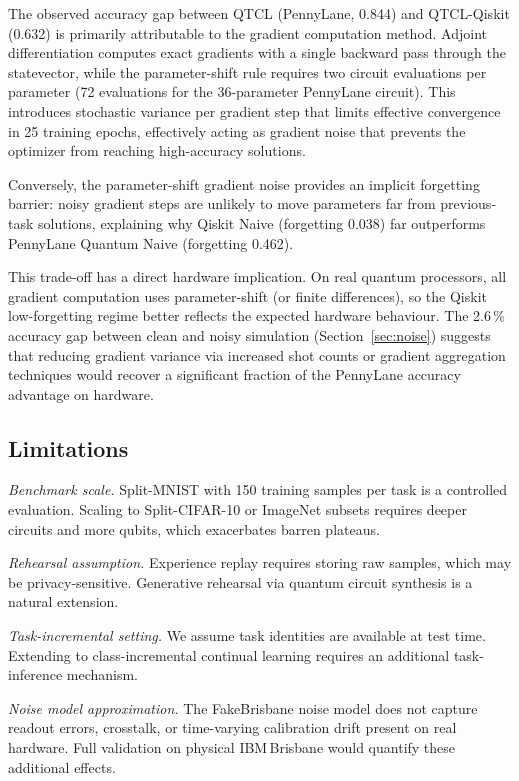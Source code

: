 \documentclass[a4paper,nopdfoutputerror]{quantumarticle}
\begin{document}
The observed accuracy gap between QTCL (PennyLane, 0.844) and QTCL-Qiskit
(0.632) is primarily attributable to the gradient computation method.
Adjoint differentiation computes exact gradients with a single backward pass
through the statevector, while the parameter-shift rule requires two circuit
evaluations per parameter (72 evaluations for the 36-parameter PennyLane
circuit).
This introduces stochastic variance per gradient step that limits effective
convergence in 25 training epochs, effectively acting as gradient noise
that prevents the optimizer from reaching high-accuracy solutions.

Conversely, the parameter-shift gradient noise provides an implicit forgetting
barrier: noisy gradient steps are unlikely to move parameters far from
previous-task solutions, explaining why Qiskit Naive (forgetting 0.038) far
outperforms PennyLane Quantum Naive (forgetting 0.462).

This trade-off has a direct hardware implication.
On real quantum processors, all gradient computation uses parameter-shift
(or finite differences), so the Qiskit low-forgetting regime better reflects
the expected hardware behaviour.
The 2.6\,\% accuracy gap between clean and noisy simulation
(Section~\ref{sec:noise}) suggests that reducing gradient variance via
increased shot counts or gradient aggregation techniques would recover
a significant fraction of the PennyLane accuracy advantage on hardware.

\subsection{Limitations}

\noindent\textit{Benchmark scale.}
Split-MNIST with 150 training samples per task is a controlled evaluation.
Scaling to Split-CIFAR-10 or ImageNet subsets requires deeper circuits and
more qubits, which exacerbates barren plateaus.

\noindent\textit{Rehearsal assumption.}
Experience replay requires storing raw samples, which may be privacy-sensitive.
Generative rehearsal via quantum circuit synthesis is a natural extension.

\noindent\textit{Task-incremental setting.}
We assume task identities are available at test time.
Extending to class-incremental continual learning requires an additional
task-inference mechanism.

\noindent\textit{Noise model approximation.}
The FakeBrisbane noise model does not capture readout errors, crosstalk, or
time-varying calibration drift present on real hardware.
Full validation on physical IBM\,Brisbane would quantify these additional effects.
\end{document}
